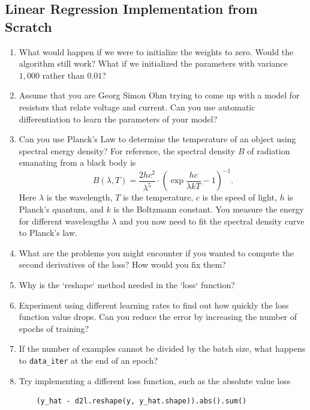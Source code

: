 \documentclass{article}
\begin{document}
\subsection{Linear Regression Implementation from Scratch}
\begin{enumerate}
\item What would happen if we were to initialize the weights to zero. Would the algorithm still work? What if we initialized the parameters with variance $1,000$ rather than $0.01$?

\item Assume that you are Georg Simon Ohm trying to come up with a model for resistors that relate voltage and current. Can you use automatic differentiation to learn the parameters of your model?

\item Can you use Planck's Law to determine the temperature of an object using spectral energy density? For reference, the spectral density $B$ of radiation emanating from a black body is
$$
B(\lambda, T) = \frac{2 hc^2}{\lambda^5} \cdot \left(\exp \frac{h c}{\lambda k T} - 1\right)^{-1}.
$$
Here $\lambda$ is the wavelength, $T$ is the temperature, $c$ is the speed of light, $h$ is Planck's quantum, and $k$ is the Boltzmann constant. You measure the energy for different wavelengths $\lambda$ and you now need to fit the spectral density curve to Planck's law.

\item What are the problems you might encounter if you wanted to compute the second derivatives of the loss? How would you fix them?

\item Why is the `reshape` method needed in the `loss` function?

\item Experiment using different learning rates to find out how quickly the loss function value drops. Can you reduce the error by increasing the number of epochs of training?

\item If the number of examples cannot be divided by the batch size, what happens to \texttt{data_iter} at the end of an epoch?

\item Try implementing a different loss function, such as the absolute value loss
\begin{verbatim}
	(y_hat - d2l.reshape(y, y_hat.shape)).abs().sum()
\end{verbatim}


\end{enumerate}
\end{document}
